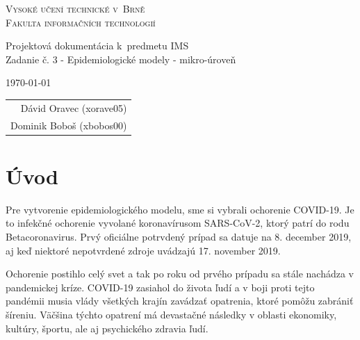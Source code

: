 \documentclass[a4paper, 11pt]{article}
\begin{document}
	\begin{titlepage}
		\begin{center}
			\Huge
			\textsc{Vysoké učení technické v~Brně} \\
			\huge
			\textsc{Fakulta informačních technologií} \\
			\begin{figure}[h]
                \centering
            \end{figure}
			\LARGE
			Projektová dokumentácia k~predmetu IMS \\
			\Huge
			Zadanie č. 3 - Epidemiologické modely - mikro-úroveň
		\end{center}

		{\Large
			\today
			\hfill
			\begin{tabular}{r}
			Dávid Oravec (xorave05) \\
			Dominik Boboš (xbobos00)
			\end{tabular}
		}
	\end{titlepage}
	\newpage
	
	\tableofcontents
	\newpage
	
	\section{Úvod}
	\par Pre vytvorenie epidemiologického modelu, sme si vybrali ochorenie COVID-19. Je to infekčné ochorenie vyvolané koronavírusom SARS-CoV-2, ktorý patrí do rodu Betacoronavirus. Prvý oficiálne potrvdený prípad sa datuje na 8. december 2019, aj keď niektoré nepotvrdené zdroje uvádzajú 17. november 2019. \cite{guardian}
	\newline
	
	\par Ochorenie postihlo celý svet a tak po roku od prvého prípadu sa stále nachádza v pandemickej kríze. COVID-19 zasiahol do života ľudí a v boji proti tejto pandémii musia vlády všetkých krajín zavádzať opatrenia, ktoré pomôžu zabrániť šíreniu. Väčšina týchto opatrení má devastačné následky v oblasti ekonomiky, kultúry, športu, ale aj psychického zdravia ľudí.
	\newline
	
\end{document}
